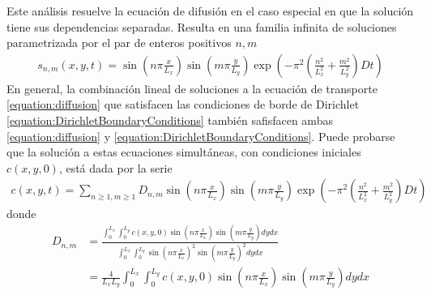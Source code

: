 \documentclass{article}
\begin{document}
  Este análisis resuelve la ecuación de difusión en el caso especial en que la solución tiene sus dependencias separadas.
  Resulta en una familia infinita de soluciones parametrizada por el par de enteros positivos \(n, m\)
  \begin{align}
    s_{n, m}(x, y, t)
    =
    \sin\left(n \pi \frac{x}{L_x} \right)
    \sin\left(m \pi \frac{y}{L_y}\right)
    \exp\left(
      - \pi^2 \left(
        \frac{n^2}{L_x^2} + \frac{m^2}{L_y^2}
      \right)
      D t
    \right)
  \end{align}
  En general, la combinación lineal de soluciones a la ecuación de transporte \eqref{equation:diffusion} que satisfacen las condiciones de borde de Dirichlet \eqref{equation:DirichletBoundaryConditions}
  también safisfacen ambas \eqref{equation:diffusion} y \eqref{equation:DirichletBoundaryConditions}.
  Puede probarse que la solución a estas ecuaciones simultáneas, con condiciones iniciales \(c(x, y, 0)\),
  está dada por la serie
  \begin{align}
    c(x, y, t)
    =
    \sum_{n \geq 1, m \geq 1}
      D_{n, m}
      \sin\left( n \pi \frac{x}{L_x} \right)
      \sin\left( m \pi \frac{y}{L_y} \right)
      \exp\left(
        - \pi^2 \left(
          \frac{n^2}{L_x^2} + \frac{m^2}{L_y^2}
        \right)
        D t
      \right)
  \end{align}
  donde
  \begin{align}
    D_{n, m}
    &=
    \frac{
      \int_0^{L_x}
        \int_0^{L_y}
          c(x, y, 0)
          \sin\left( n \pi \frac{x}{L_x} \right)
          \sin\left( m \pi \frac{y}{L_y} \right)
        d y
      d x
    }{
      \int_0^{L_x}
        \int_0^{L_y}
        \sin\left( n \pi \frac{x}{L_x} \right)^2
          \sin\left( m \pi \frac{y}{L_y} \right)^2
        d y
      d x
    }
    \\
    &=
    \frac{4}{L_x L_y} 
    \int_0^{L_x}
      \int_0^{L_y}
        c(x, y, 0)
        \sin\left( n \pi \frac{x}{L_x} \right)
        \sin\left( m \pi \frac{y}{L_y} \right)
      d y
    d x
  \end{align}
\end{document}
